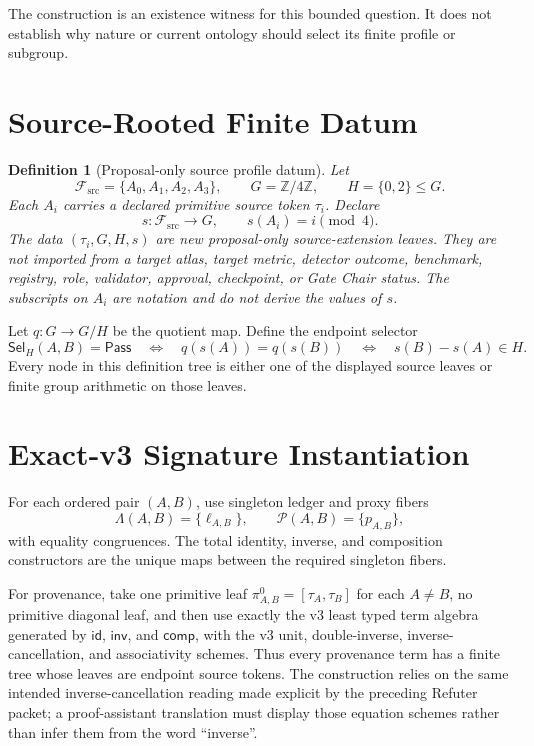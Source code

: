 \documentclass[11pt]{article}
\newtheorem{definition}{Definition}
\newcommand{\Pass}{\mathsf{Pass}}
\newcommand{\Sel}{\mathsf{Sel}_{H}}
\begin{document}
The construction is an existence witness for this bounded question. It does
not establish why nature or current ontology should select its finite profile
or subgroup.

\section{Source-Rooted Finite Datum}

\begin{definition}[Proposal-only source profile datum]
Let
\[
 \mathcal F_{\mathrm{src}}=\{A_0,A_1,A_2,A_3\},\qquad
 G=\mathbb Z/4\mathbb Z,\qquad H=\{0,2\}\leq G.
\]
Each \(A_i\) carries a declared primitive source token \(\tau_i\). Declare
\[
 s:\mathcal F_{\mathrm{src}}\longrightarrow G,\qquad s(A_i)=i\pmod 4.
\]
The data \((\tau_i,G,H,s)\) are new proposal-only source-extension leaves.
They are not imported from a target atlas, target metric, detector outcome,
benchmark, registry, role, validator, approval, checkpoint, or Gate Chair
status. The subscripts on \(A_i\) are notation and do not derive the values
of \(s\).
\end{definition}

Let \(q:G\to G/H\) be the quotient map. Define the endpoint selector
\[
 \Sel(A,B)=\Pass
 \quad\Longleftrightarrow\quad
 q(s(A))=q(s(B))
 \quad\Longleftrightarrow\quad
 s(B)-s(A)\in H.
\]
Every node in this definition tree is either one of the displayed source
leaves or finite group arithmetic on those leaves.

\section{Exact-v3 Signature Instantiation}

For each ordered pair \((A,B)\), use singleton ledger and proxy fibers
\[
 \Lambda(A,B)=\{\ell_{A,B}\},\qquad
 \mathcal P(A,B)=\{p_{A,B}\},
\]
with equality congruences. The total identity, inverse, and composition
constructors are the unique maps between the required singleton fibers.

For provenance, take one primitive leaf
\(\pi^0_{A,B}=[\tau_A,\tau_B]\) for each \(A\neq B\), no primitive diagonal
leaf, and then use exactly the v3 least typed term algebra generated by
\(\mathsf{id}\), \(\mathsf{inv}\), and \(\mathsf{comp}\), with the v3 unit,
double-inverse, inverse-cancellation, and associativity schemes. Thus every
provenance term has a finite tree whose leaves are endpoint source tokens.
The construction relies on the same intended inverse-cancellation reading
made explicit by the preceding Refuter packet; a proof-assistant translation
must display those equation schemes rather than infer them from the word
``inverse''.
\end{document}
